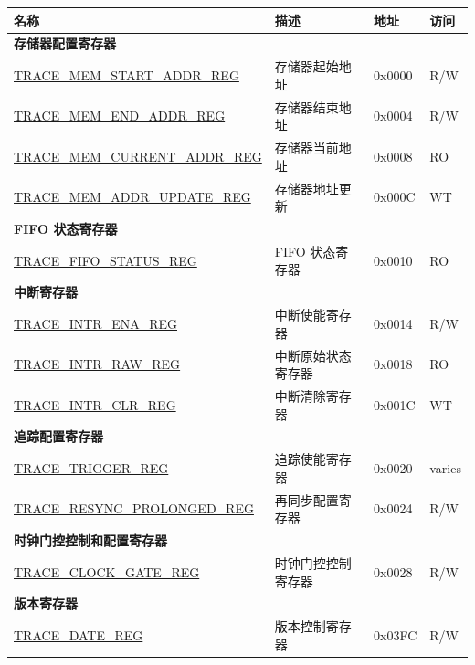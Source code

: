 \begin{longtable}{ | p{6cm} | p{7.2cm} | p{1.3cm} | p{1cm} | }
\hline\rowcolor{lightgray}
\textbf{名称} & \textbf{描述} &  \textbf{地址} & \textbf{访问} \\ \hline
\endhead
\multicolumn{4}{|l|}{\textbf{存储器配置寄存器}} \\ \hline
\hyperref[regdesc:TRACEMEMSTARTADDRREG]{TRACE\_MEM\_START\_ADDR\_REG} & 存储器起始地址 & 0x0000 & R/W \\ \hline
\hyperref[regdesc:TRACEMEMENDADDRREG]{TRACE\_MEM\_END\_ADDR\_REG} & 存储器结束地址 & 0x0004 & R/W \\ \hline
\hyperref[regdesc:TRACEMEMCURRENTADDRREG]{TRACE\_MEM\_CURRENT\_ADDR\_REG} & 存储器当前地址 & 0x0008 & RO \\ \hline
\hyperref[regdesc:TRACEMEMADDRUPDATEREG]{TRACE\_MEM\_ADDR\_UPDATE\_REG} & 存储器地址更新 & 0x000C & WT \\ \hline
\multicolumn{4}{|l|}{\textbf{FIFO 状态寄存器}} \\ \hline
\hyperref[regdesc:TRACEFIFOSTATUSREG]{TRACE\_FIFO\_STATUS\_REG} & FIFO 状态寄存器 & 0x0010 & RO \\ \hline
\multicolumn{4}{|l|}{\textbf{中断寄存器}} \\ \hline
\hyperref[regdesc:TRACEINTRENAREG]{TRACE\_INTR\_ENA\_REG} & 中断使能寄存器 & 0x0014 & R/W \\ \hline
\hyperref[regdesc:TRACEINTRRAWREG]{TRACE\_INTR\_RAW\_REG} & 中断原始状态寄存器 & 0x0018 & RO \\ \hline
\hyperref[regdesc:TRACEINTRCLRREG]{TRACE\_INTR\_CLR\_REG} & 中断清除寄存器 & 0x001C & WT \\ \hline
\multicolumn{4}{|l|}{\textbf{追踪配置寄存器}} \\ \hline
\hyperref[regdesc:TRACETRIGGERREG]{TRACE\_TRIGGER\_REG} & 追踪使能寄存器 & 0x0020 & varies \\ \hline
\hyperref[regdesc:TRACERESYNCPROLONGEDREG]{TRACE\_RESYNC\_PROLONGED\_REG} & 再同步配置寄存器 & 0x0024 & R/W \\ \hline
\multicolumn{4}{|l|}{\textbf{时钟门控控制和配置寄存器}} \\ \hline
\hyperref[regdesc:TRACECLOCKGATEREG]{TRACE\_CLOCK\_GATE\_REG} & 时钟门控控制寄存器 & 0x0028 & R/W \\ \hline
\multicolumn{4}{|l|}{\textbf{版本寄存器}} \\ \hline
\hyperref[regdesc:TRACEDATEREG]{TRACE\_DATE\_REG} & 版本控制寄存器 & 0x03FC & R/W \\ \hline
\end{longtable}

